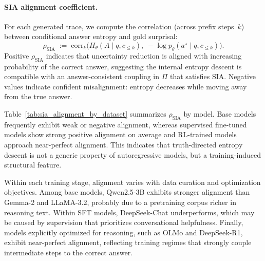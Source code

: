 \documentclass{article}
\begin{document}
\paragraph{SIA alignment coefficient.}
For each generated trace, we compute the correlation (across prefix steps~$k$) between conditional answer entropy and gold surprisal:
\begin{equation*}
\rho_{\mathrm{SIA}} \;:=\; \mathrm{corr}_{k}\!\Big(
H_{\theta}(A \mid q, c_{\le k}),
\;-\log p_{\theta}(a^{\star} \mid q, c_{\le k})
\Big).
\end{equation*}
Positive $\rho_{\mathrm{SIA}}$ indicates that uncertainty reduction is aligned with increasing probability of the correct answer, suggesting the internal entropy descent is compatible with an answer-consistent coupling in $\Pi$ that satisfies SIA. Negative values indicate confident misalignment: entropy decreases while moving away from the true answer.

Table~\ref{tab:sia_alignment_by_dataset} summarizes $\rho_{\mathrm{SIA}}$ by model. Base models frequently exhibit weak or negative alignment, whereas supervised fine-tuned models show strong positive alignment on average and RL-trained models approach near-perfect alignment. This indicates that truth-directed entropy descent is not a generic property of autoregressive models, but a training-induced structural feature.

Within each training stage, alignment varies with data curation and optimization objectives. Among base models, Qwen2.5-3B exhibits stronger alignment than Gemma-2 and LLaMA-3.2, probably due to a pretraining corpus richer in reasoning text. Within SFT models, DeepSeek-Chat underperforms, which may be caused by supervision that prioritizes conversational helpfulness. Finally, models explicitly optimized for reasoning, such as OLMo and DeepSeek-R1, exhibit near-perfect alignment, reflecting training regimes that strongly couple intermediate steps to the correct answer.
\end{document}
